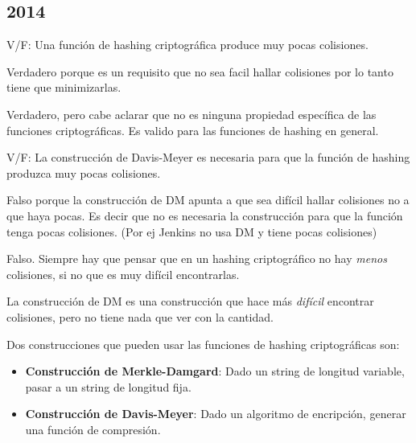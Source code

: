 \documentclass[a4paper]{article}
\newenvironment{enunciado}[3]{%
    \vspace{\baselineskip}
    \tcolorbox[beamer,%
    noparskip,breakable,
    colback=LightGreen,colframe=DarkGreen,%
    colbacklower=LimeGreen!75!LightGreen,%
    title=\small Enunciado: Año #1\, Cuatrimestre #2\, Oportunidad #3]}%
    {\endtcolorbox}
\newenvironment{criterio}[3]{%
    \tcolorbox[beamer,%
    noparskip,breakable,
    colback=LightCoral,colframe=DarkRed,%
    colbacklower=Tomato!75!LightCoral,%
    title=\small Criterio de Corrección: Año #1\, Cuatrimestre #2\, Oportunidad #3]}%
    {\endtcolorbox}
\begin{document}
    \subsection{2014}

    \begin{enunciado}{2014}{2}{1}
        V/F: Una   función   de   hashing criptográfica   produce   muy pocas colisiones.
    \end{enunciado}

    \begin{criterio}{2014}{2}{1}
        Verdadero porque es un requisito que no sea facil hallar colisiones por lo tanto tiene que minimizarlas.
    \end{criterio}

    Verdadero, pero cabe aclarar que no es ninguna propiedad específica de las funciones criptográficas. Es valido para las funciones de hashing en general.

    \begin{enunciado}{2014}{2}{1}
        V/F: La   construcción   de   Davis-Meyer es necesaria para que la función   de   hashing   produzca muy   pocas   colisiones. 
    \end{enunciado}
    
    \begin{criterio}{2014}{2}{1}
        Falso porque la construcción de DM apunta a que sea difícil hallar colisiones no a que haya pocas. Es decir que no es necesaria la construcción para que la función tenga pocas colisiones. (Por ej Jenkins no usa DM y tiene pocas colisiones)
    \end{criterio}
    
    Falso. Siempre hay que pensar que en un hashing criptográfico no hay \textit{menos} colisiones, si no que es muy difícil encontrarlas.
    
    La construcción de DM es una construcción que hace más \textit{difícil} encontrar colisiones, pero no tiene nada que ver con la cantidad.
    
    Dos construcciones que pueden usar las funciones de hashing criptográficas son:

    \begin{itemize}
        \item \textbf{Construcción de Merkle-Damgard}: Dado un string de longitud variable, pasar a un string de longitud fija.
        \item \textbf{Construcción de Davis-Meyer}: Dado un algoritmo de encripción, generar una función de compresión.
    \end{itemize}
\end{document}
